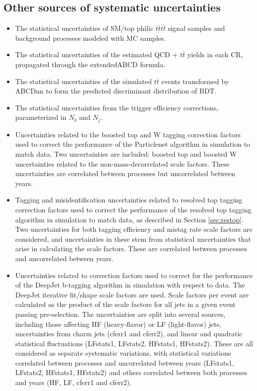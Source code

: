 \documentclass[twoside]{article}
\begin{document}
\subsection{Other sources of systematic uncertainties}


\begin{itemize}
    \item The statistical uncertainties of SM/top philic $t\bar{t}t\bar{t}$ signal samples and background processes modeled with MC samples.
    \item The statistical uncertainties of the estimated QCD + $t\bar{t}$ yields in each CR, propagated through the extendedABCD formula.
    \item The statistical uncertainties of the simulated $t\bar{t}$ events transformed by ABCDnn to form the predicted discriminant distribution of BDT.
    \item The statistical uncertainties from the trigger efficiency corrections, parameterized in $N_b$ and $N_j$.
    \item Uncertainties related to the boosted top and W tagging correction factors used to correct the performance of the Particlenet algorithm in simulation to match data. Two uncertainties are included: boosted top and boosted W uncertainties related to the non-mass-decorrelated scale factors. These uncertainties are correlated between processes but uncorrelated between years.
    \item Tagging and misidentification uncertainties related to resolved top tagging correction factors used to correct the performance of the resolved top tagging algorithm in simulation to match data, as described in Section \ref{sec:restop}. Two uncertainties for both tagging efficiency and mistag rate scale factors are considered, and uncertainties in these stem from statistical uncertainties that arise in calculating the scale factors. These are correlated between processes and uncorrelated between years.
    \item Uncertainties related to correction factors used to correct for the performance of the DeepJet b-tagging algorithm in simulation with respect to data. The DeepJet iterative fit/shape scale factors are used. Scale factors per event are calculated as the  product of the scale factors for all jets in a given event passing pre-selection. The uncertainties are split into several sources, including those affecting HF (heavy-flavor) or LF (light-flavor) jets, uncertainties from charm jets (cferr1 and cferr2), and linear and quadratic statistical fluctuations (LFstats1, LFstats2, HFstats1, HFstats2). These are all considered as separate systematic variations, with statistical variations correlated between processes and uncorrelated between years (LFstats1, LFstats2, HFstats1, HFstats2) and others correlated between both processes and years (HF, LF, cferr1 and cferr2).

\end{itemize}
\end{document}
